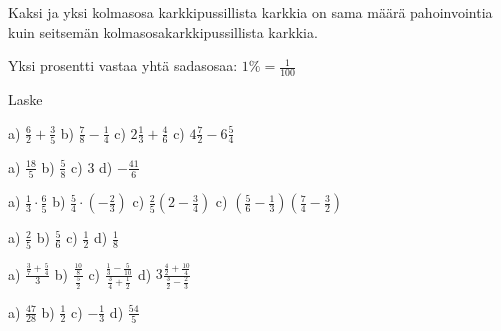 

Kaksi ja yksi kolmasosa karkkipussillista karkkia on sama määrä pahoinvointia kuin seitsemän kolmasosakarkkipussillista karkkia.


Yksi prosentti vastaa yhtä sadasosaa: $1 \% = \frac{1}{100}$

Laske %
\begin{tehtava}
    a) $\frac{6}{2} + \frac{3}{5}$
    b) $\frac{7}{8} - \frac{1}{4}$
    c) $2 \frac{1}{3} + \frac{4}{6}$
    c) $4 \frac{7}{2} - 6 \frac{5}{4}$
    
    \begin{vastaus}
        a) $\frac{18}{5}$
        b) $\frac{5}{8}$
        c) $3$
        d) $-\frac{41}{6}$
    \end{vastaus}
\end{tehtava}

\begin{tehtava}
    a) $\frac{1}{3} \cdot \frac{6}{5}$
    b) $\frac{5}{4} \cdot (-\frac{2}{3})$
    c) $\frac{2}{5} (2 - \frac{3}{4})$
    c) $(\frac{5}{6} - \frac{1}{3})(\frac{7}{4} - \frac{3}{2})$
    
    \begin{vastaus}
        a) $\frac{2}{5}$
        b) $\frac{5}{6}$
        c) $\frac{1}{2}$
        d) $\frac{1}{8}$
    \end{vastaus}
\end{tehtava}

\begin{tehtava} %
    a) $ \frac{\frac{3}{7} + \frac{5}{4}}{3}$
    b) $ \frac{\frac{10}{8}}{\frac{5}{2}}$
    c) $ \frac{\frac{1}{3} - \frac{5}{10}}{\frac{3}{4} + \frac{1}{2}}$
    d) $ 3\frac{\frac{4}{2} + \frac{10}{4}}{\frac{3}{2} - \frac{2}{3}}$
    
    \begin{vastaus}
        a) $\frac{47}{28}$
        b) $\frac{1}{2}$
        c) $-\frac{1}{3}$
        d) $\frac{54}{5}$
    \end{vastaus}
\end{tehtava}

